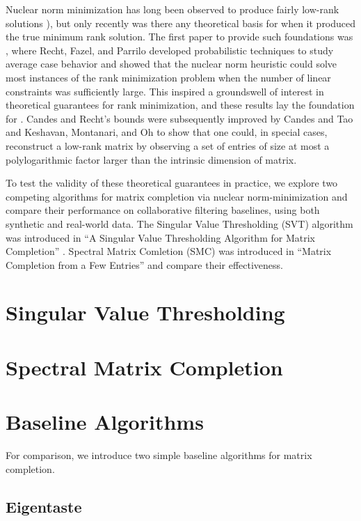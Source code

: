 \documentclass{article} %
\begin{document}
Nuclear norm minimization has long been observed to produce fairly
low-rank solutions \cite{r11, r12, r26}), but only recently was there
any theoretical basis for when it produced the true minimum rank
solution. The first paper to provide such foundations was \cite{r24},
where Recht, Fazel, and Parrilo developed probabilistic techniques to
study average case behavior and showed that the nuclear norm heuristic
could solve most instances of the rank minimization problem when the
number of linear constraints was sufficiently large. This inspired a
groundswell of interest in theoretical guarantees for rank
minimization, and these results lay the foundation for \cite{r4}.
Candes and Recht’s bounds were subsequently improved by Candes and Tao
\cite{r7} and Keshavan, Montanari, and Oh \cite{keshavan2010matrix} to
show that one could, in special cases, reconstruct a low-rank matrix
by observing a set of entries of size at most a polylogarithmic factor
larger than the intrinsic dimension of matrix.

To test the validity of these theoretical guarantees in practice, we
explore two competing algorithms for matrix completion via nuclear
norm-minimization and compare their performance on collaborative
filtering baselines, using both synthetic and real-world data. The
Singular Value Thresholding (SVT) algorithm was introduced in ``A
Singular Value Thresholding Algorithm for Matrix Completion''
\cite{cai2010singular}. Spectral Matrix Comletion (SMC) was introduced
in ``Matrix Completion from a Few Entries'' \cite{keshavan2010matrix}
and compare their effectiveness.


\section{Singular Value Thresholding}



\section{Spectral Matrix Completion}



\section{Baseline Algorithms}

For comparison, we introduce two simple baseline algorithms for matrix
completion.

\subsection{Eigentaste}
\end{document}
